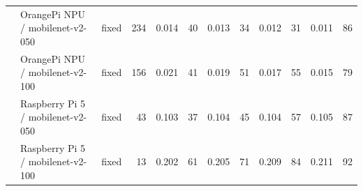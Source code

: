\documentclass[10pt]{article}
\begin{document}
\begin{center}
\begin{longtable}{@{}lll r *{4}{r r}@{}}
\addlinespace[2pt]
 & OrangePi NPU / mobilenet-v2-050 & fixed & 234 & 0.014 & 40 & 0.013 & 34 & 0.012 & 31 & 0.011 & 86 \\
\addlinespace[2pt]
 & OrangePi NPU / mobilenet-v2-100 & fixed & 156 & 0.021 & 41 & 0.019 & 51 & 0.017 & 55 & 0.015 & 79 \\
\addlinespace[2pt]
 & Raspberry Pi 5 / mobilenet-v2-050 & fixed & 43 & 0.103 & 37 & 0.104 & 45 & 0.104 & 57 & 0.105 & 87 \\
\addlinespace[2pt]
 & Raspberry Pi 5 / mobilenet-v2-100 & fixed & 13 & 0.202 & 61 & 0.205 & 71 & 0.209 & 84 & 0.211 & 92 \\
\bottomrule
\end{longtable}\end{center}
\end{document}
